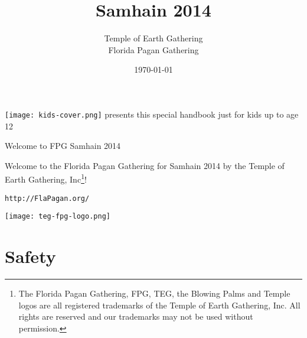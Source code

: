 \documentclass[9pt,twoside,openright,final,article,letterpaper]{memoir}
\date{\today}
\title{Samhain 2014}
\author{Temple of Earth Gathering \\ Florida Pagan Gathering}
\let\oldsection=\section
\renewcommand{\section}[1]{%
  \nopagebreak
  \vspace{6pt} %
  \needspace{1.5in}
  \oldsection{#1}
  \nopagebreak}
\begin{document}
\thispagestyle{empty}
\vfill
\texttt{[image: kids-cover.png]}
{ presents
  this special handbook just for kids up to age 12}
\vfill

\pagestyle{headings}
\newpage
\thispagestyle{headings}

{\hminfamily \HUGE Welcome to FPG Samhain 2014}

\begin{multicols}{3}

  \tableofcontents*

  \columnbreak

  Welcome to the Florida Pagan Gathering\texttrademark{} for Samhain 2014 by the
  Temple of Earth Gathering, Inc\texttrademark{}\footnote{The Florida Pagan
    Gathering, FPG, TEG, the Blowing Palms and Temple logos are all
    registered trademarks of the Temple of Earth Gathering, Inc.
    All rights are reserved and our trademarks may not be used without
    permission.}!


  \texttt{http://FlaPagan.org/}

  {\centering
    \texttt{[image: teg-fpg-logo.png]}}

\end{multicols}

\vspace{1pt}
\vfill

\section{Safety}
\end{document}

